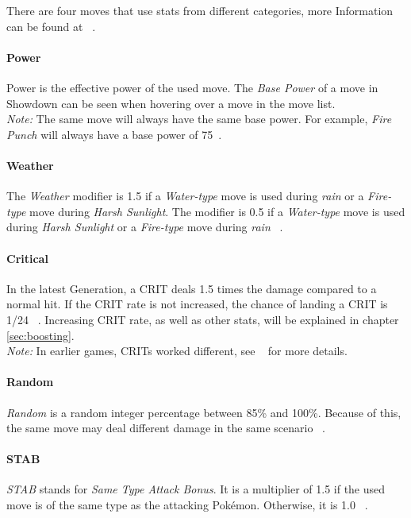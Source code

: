 There are four moves that use stats from different categories, more Information can be found
at ~\autocite{Bulbapedia:MoveStatDifferentCategories}.

\paragraph{Power}
Power is the effective power of the used move.
The \textit{Base Power} of a move in Showdown can be seen when hovering over a move in the move list. \\
\textit{Note:} The same move will always have the same base power. For example, \textit{Fire Punch} will
always have a base power of 75~\autocite{Bulbapedia:FirePunch}.

\paragraph{Weather}
The \textit{Weather} modifier is 1.5 if a \textit{Water-type} move is used during \textit{rain} or a 
\textit{Fire-type} move during \textit{Harsh Sunlight}. The modifier is 0.5 if a \textit{Water-type} move
is used during \textit{Harsh Sunlight} or a \textit{Fire-type} move during \textit{rain} ~\autocite{Bulbapedia:Damage}.

\paragraph{Critical}
In the latest Generation, a \ac{CRIT} deals 1.5 times the damage compared to a normal hit.
If the \ac{CRIT} rate is not increased, the chance of landing a \ac{CRIT} is 1/24
~\autocite{Bulbapedia:CriticalHit}. Increasing \ac{CRIT} rate, as well as other stats, will 
be explained in chapter \ref{sec:boosting}. \\
\textit{Note:} In earlier games, \ac{CRIT}s worked different, see ~\autocite{Bulbapedia:CriticalHit} for
more details.

\paragraph{Random}
\textit{Random} is a random integer percentage between 85\% and 100\%. Because of this, the same move
may deal different damage in the same scenario ~\autocite{Bulbapedia:Damage}.

\paragraph{STAB}
\textit{STAB} stands for \textit{Same Type Attack Bonus}. It is a multiplier of 1.5 if the used move
is of the same type as the attacking Pokémon. Otherwise, it is 1.0 ~\autocite{Bulbapedia:Damage}.

